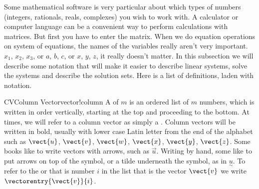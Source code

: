 %
{Some mathematical software is very particular about which types of numbers (integers, rationals, reals, complexes) you wish to work with.}
{
%
}{
}
%
{A calculator or computer language can be a convenient way to perform calculations with matrices.  But first you have to enter the matrix.}
{
%
}{
}
%
When we do equation operations on system of equations, the names of the variables really aren't very important.  $x_1$, $x_2$, $x_3$, or $a$, $b$, $c$, or $x$, $y$, $z$, it really doesn't matter.  In this subsection we will describe some notation that will make it easier to describe linear systems, solve the systems and describe the solution sets.  Here is a list of definitions, laden with notation.\par
%
\begin{definition}{CV}{Column Vector}{vector!column}
A  of  $m$ is an ordered list of $m$ numbers, which is written in order vertically, starting at the top and proceeding to the bottom.  At times, we will refer to a column vector as simply a .  Column vectors will be written in bold, usually with lower case Latin letter from the end of the alphabet such as $\vect{u}$, $\vect{v}$, $\vect{w}$, $\vect{x}$, $\vect{y}$, $\vect{z}$.  Some books like to write vectors with arrows, such as $\vec{u}$.  Writing by hand, some like to put arrows on top of the symbol, or a tilde underneath the symbol, as in $\underset{\sim}{\textstyle u}$.  To refer to the  or  that is number $i$ in the list that is the vector $\vect{v}$ we write $\vectorentry{\vect{v}}{i}$.
\end{definition}
